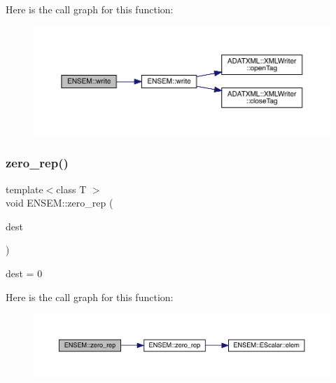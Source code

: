 Here is the call graph for this function\+:\nopagebreak
\begin{figure}[H]
\begin{center}
\leavevmode
\includegraphics[width=350pt]{db/dcc/group__primscalar_ga7db0b2a7539f81de4777d87b90de73c6_cgraph}
\end{center}
\end{figure}
\mbox{\label{group__primscalar_gaf5afd39d3948d69df06ad306b2fdb494}} 
\subsubsection{\texorpdfstring{zero\_rep()}{zero\_rep()}}
{\footnotesize\ttfamily template$<$class T $>$ \\
void E\+N\+S\+E\+M\+::zero\+\_\+rep (\begin{DoxyParamCaption}\item[{\mbox{\hyperlink{classENSEM_1_1PScalar}{P\+Scalar}}$<$ T $>$ \&}]{dest }\end{DoxyParamCaption})\hspace{0.3cm}{\ttfamily [inline]}}



dest = 0 

Here is the call graph for this function\+:\nopagebreak
\begin{figure}[H]
\begin{center}
\leavevmode
\includegraphics[width=350pt]{db/dcc/group__primscalar_gaf5afd39d3948d69df06ad306b2fdb494_cgraph}
\end{center}
\end{figure}

